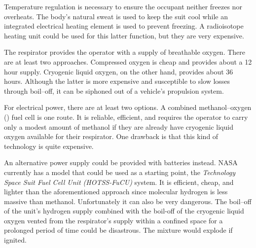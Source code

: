 Temperature regulation is necessary to ensure the occupant neither freezes nor overheats. The body's natural sweat is used to keep the suit cool while an integrated electrical heating element is used to prevent freezing. A radioisotope heating unit could be used for this latter function, but they are very expensive.

The respirator provides the operator with a supply of breathable oxygen. There are at least two approaches. Compressed oxygen is cheap and provides about a 12 hour supply. Cryogenic liquid oxygen, on the other hand, provides about 36 hours. Although the latter is more expensive and susceptible to slow losses through boil--off, it can be siphoned out of a vehicle's propulsion system.

For electrical power, there are at least two options. A combined methanol--oxygen () fuel cell is one route. It is reliable, efficient, and requires the operator to carry only a modest amount of methanol if they are already have cryogenic liquid oxygen available for their respirator. One drawback is that this kind of technology is quite expensive.

An alternative power supply could be provided with batteries instead. NASA currently has a model that could be used as a starting point, the {\it {} Technology Space Suit Fuel Cell Unit (HOTSS-FuCU)} system. It is efficient, cheap, and lighter than the aforementioned approach since molecular hydrogen is less massive than methanol. Unfortunately it can also be very dangerous. The boil--off of the unit's hydrogen supply combined with the boil-off of the cryogenic liquid oxygen vented from the respirator's supply within a confined space for a prolonged period of time could be disastrous. The mixture would explode if ignited.

